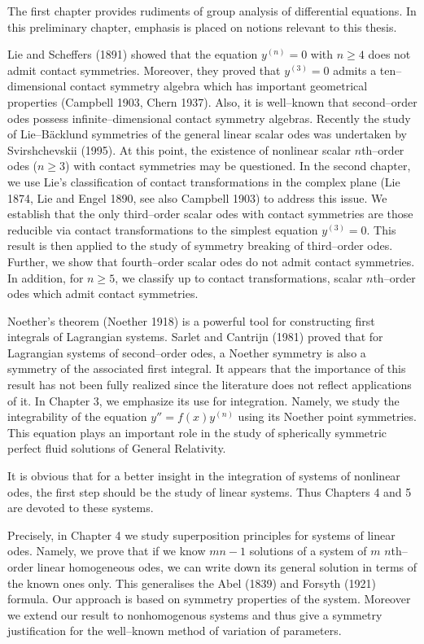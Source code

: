 The first chapter provides rudiments of group analysis of differential
equations. In this preliminary  chapter, emphasis is placed on notions
relevant to this thesis.  

Lie and Scheffers (1891) showed that the equation $y^{(n)}=0$ with $n\ge 4$ does not admit contact
symmetries. Moreover, they proved that $y^{(3)}=0$ admits a ten--dimensional
contact symmetry algebra which has important geometrical properties
(Campbell 1903, Chern 1937). Also,
it is well--known that second--order odes possess infinite--dimensional contact
symmetry algebras. Recently the study of Lie--B\"acklund symmetries of
the general linear scalar odes  was undertaken by Svirshchevskii (1995).
At this point, the existence of nonlinear scalar $n$th--order odes ($n\ge 3$)
with contact symmetries may be questioned. In the second chapter, we use
Lie's classification of contact transformations in the complex plane
(Lie 1874, Lie and Engel 1890, see also  Campbell 1903) to address this issue.
We establish that the only third--order scalar odes  with
contact symmetries are those  reducible via contact transformations  to the
simplest equation $y^{(3)}=0$. This result is then applied to the study of
symmetry breaking of third--order odes.
Further, we show that fourth--order scalar odes do
not admit contact symmetries. In addition, for $n\ge 5$, we classify up to
contact transformations, scalar $n$th--order odes which admit contact
symmetries.

Noether's theorem (Noether 1918) is a powerful tool for constructing first integrals of
Lagrangian systems. Sarlet and Cantrijn (1981) proved that for
Lagrangian systems of
second--order odes, a Noether symmetry is also a symmetry of the associated
first integral. It appears that the importance of this result has not been
fully realized since the literature does not reflect applications of it.
In Chapter
3, we emphasize its use for integration. Namely, we study the integrability of
the equation $y''=f(x)y^{(n)}$ using its Noether point symmetries. This equation
plays  an important role in the study of spherically symmetric perfect fluid
solutions of General Relativity.

It is obvious that for a better insight in the integration of systems of
nonlinear odes, the first step should be the study of linear systems. Thus
Chapters 4 and 5 are devoted to these systems.

Precisely, in Chapter 4 we study
superposition principles for systems of linear odes. Namely, we prove that if
we know $mn-1$ solutions of a system of $m$ $n$th--order linear homogeneous
odes, we can write down its general solution in terms of the known ones only.
This generalises the Abel (1839) and Forsyth (1921) formula.
Our approach is based on symmetry properties of the system.
Moreover we extend our
result to nonhomogenous systems and thus give a symmetry justification for
the well--known method of variation of parameters.

